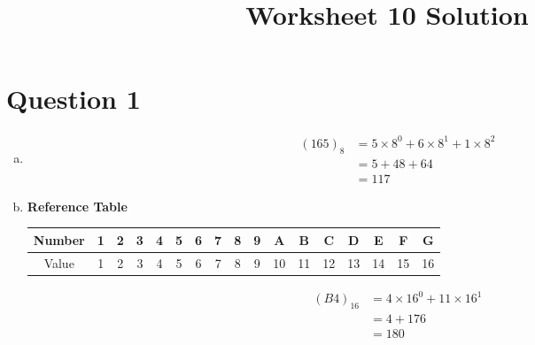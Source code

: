 \documentclass[12pt]{article}
\begin{document}
\title{Worksheet 10 Solution}
\maketitle

\section*{Question 1}
\begin{enumerate}[a.]
    \item

    \begin{align}
        (165)_8 &= 5 \times 8^0 + 6 \times 8^1 + 1 \times 8^2\\
        &= 5 + 48 + 64\\
        &= 117
    \end{align}

    \item

    \textbf{Reference Table}

    \bigskip

    \begin{tabular}{ c|c|c|c|c|c|c|c|c|c|c|c|c|c|c|c|c }
        Number & 1 & 2 & 3 & 4 & 5 & 6 & 7 & 8 & 9 & A & B & C & D & E & F & G\\
        \hline
        Value & 1 & 2 & 3 & 4 & 5 & 6 & 7 & 8 & 9 & 10 & 11 & 12 & 13 & 14 & 15 & 16
    \end{tabular}

    \setcounter{equation}{0}
    \begin{align}
        (B4)_{16} &= 4 \times 16^0 + 11 \times 16^1\\
        &= 4 + 176\\
        &= 180
    \end{align}

\end{enumerate}
\end{document}
